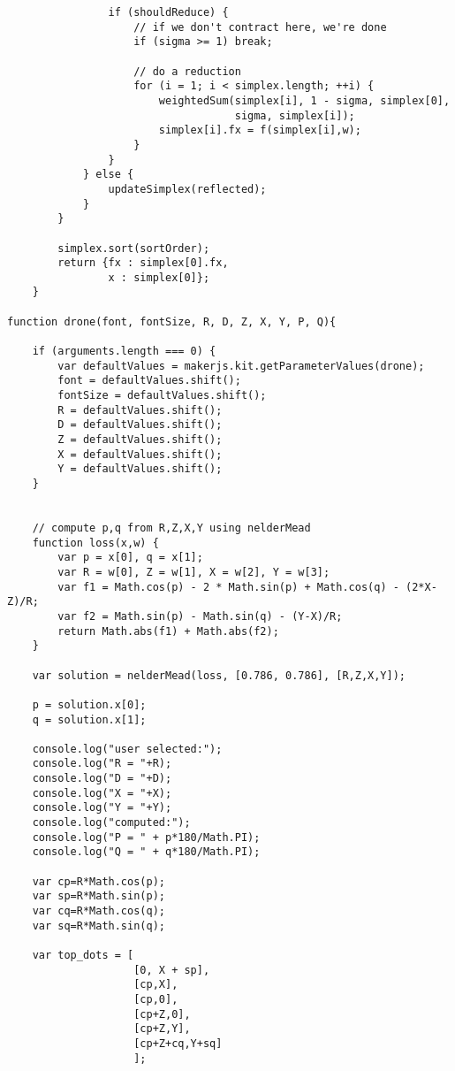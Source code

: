 \documentclass[11pt]{article}
\begin{document}
\begin{lstlisting}
                if (shouldReduce) {
                    // if we don't contract here, we're done
                    if (sigma >= 1) break;

                    // do a reduction
                    for (i = 1; i < simplex.length; ++i) {
                        weightedSum(simplex[i], 1 - sigma, simplex[0],
                                    sigma, simplex[i]);
                        simplex[i].fx = f(simplex[i],w);
                    }
                }
            } else {
                updateSimplex(reflected);
            }
        }

        simplex.sort(sortOrder);
        return {fx : simplex[0].fx,
                x : simplex[0]};
    }

function drone(font, fontSize, R, D, Z, X, Y, P, Q){
    
    if (arguments.length === 0) {
        var defaultValues = makerjs.kit.getParameterValues(drone);
        font = defaultValues.shift();
        fontSize = defaultValues.shift();
        R = defaultValues.shift();
        D = defaultValues.shift();
        Z = defaultValues.shift();
        X = defaultValues.shift();
        Y = defaultValues.shift();
    }
    

    // compute p,q from R,Z,X,Y using nelderMead
    function loss(x,w) {
        var p = x[0], q = x[1];
        var R = w[0], Z = w[1], X = w[2], Y = w[3];
        var f1 = Math.cos(p) - 2 * Math.sin(p) + Math.cos(q) - (2*X-Z)/R;
        var f2 = Math.sin(p) - Math.sin(q) - (Y-X)/R;
        return Math.abs(f1) + Math.abs(f2);
    }

    var solution = nelderMead(loss, [0.786, 0.786], [R,Z,X,Y]);
     
    p = solution.x[0];
    q = solution.x[1];
                                    
    console.log("user selected:");
    console.log("R = "+R);
    console.log("D = "+D);
    console.log("X = "+X);
    console.log("Y = "+Y);
    console.log("computed:");
    console.log("P = " + p*180/Math.PI);
    console.log("Q = " + q*180/Math.PI);
    
    var cp=R*Math.cos(p);
    var sp=R*Math.sin(p);
    var cq=R*Math.cos(q);
    var sq=R*Math.sin(q);
    
    var top_dots = [
                    [0, X + sp],
                    [cp,X],
                    [cp,0],
                    [cp+Z,0],
                    [cp+Z,Y],
                    [cp+Z+cq,Y+sq]
                    ];
    

\end{lstlisting}
\end{document}
